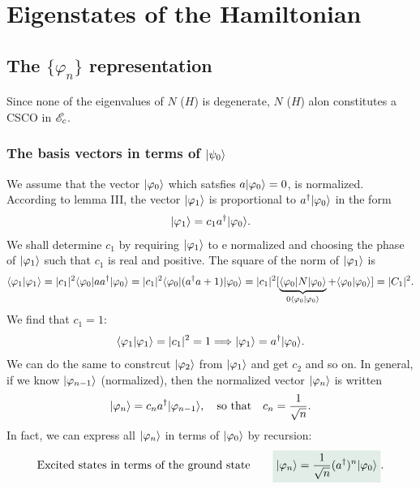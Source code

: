\section{Eigenstates of the Hamiltonian}

%
\subsection{The $\{\varphi_n\}$ representation}
Since none of the eigenvalues of $N$ ($H$) is degenerate, $N$ ($H$) alon constitutes a CSCO in $\mathscr{E}_c$.
%
\subsubsection{The basis vectors in terms of $|\psi_0\rangle$}
We assume that the vector $|\varphi_0\rangle$ which satsfies $a|\varphi_0\rangle=0$, is normalized. According to lemma III, the vector $|\varphi_1\rangle$ is proportional 
to $a^\dagger|\varphi_0\rangle$ in the form 
\begin{align*}
    |\varphi_1\rangle=c_1a^\dagger|\varphi_0\rangle.
\end{align*} 
We shall determine $c_1$ by requiring $|\varphi_1\rangle$ to e normalized and choosing the phase of $|\varphi_1\rangle$ such that $c_1$ is real and positive.
The square of the norm of $|\varphi_1\rangle$ is 
\begin{align*}
    \langle\varphi_1|\varphi_1\rangle=|c_1|^2\langle\varphi_0|aa^\dagger|\varphi_0\rangle=|c_1|^2\langle\varphi_0|(a^\dagger a+1)|\varphi_0\rangle=|c_1|^2[\underbrace{\langle\varphi_0|N|\varphi_0\rangle}_{0\langle\varphi_0|\varphi_0\rangle}+\langle\varphi_0|\varphi_0\rangle]=|C_1|^2.
\end{align*}
We find that $c_1=1$:
\begin{align}
    \langle\varphi_1|\varphi_1\rangle=|c_1|^2=1\Longrightarrow |\varphi_1\rangle=a^\dagger|\varphi_0\rangle.
\end{align}
We can do the same to constrcut $|\varphi_2\rangle$ from $|\varphi_1\rangle$ and get $c_2$ and so on. In general, if we know $|\varphi_{n-1}\rangle$ (normalized), then the 
normalized vector $|\varphi_n\rangle$ is written 
\begin{align*}
    |\varphi_n\rangle=c_na^\dagger|\varphi_{n-1}\rangle,\quad\text{so that}\quad c_n=\frac{1}{\sqrt{n}}.
\end{align*}
In fact, we can express all $|\varphi_n\rangle$ in terms of $|\varphi_0\rangle$ by recursion:
\begin{align}
    \text{Excited states in terms of the ground state}\qquad\highlight{\ket{\varphi_n}=\frac{1}{\sqrt{n}}(a^\dagger)^n\ket{\varphi_0}}.
    \label{eq:excitedstatesfromground}
\end{align}
%

